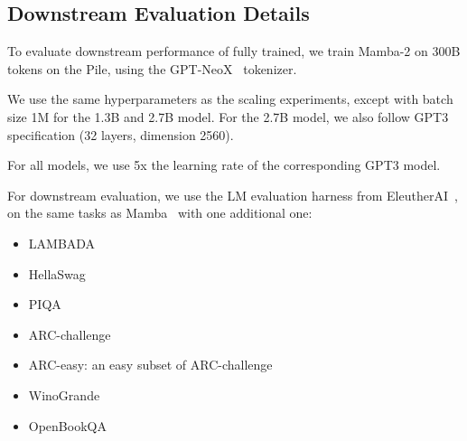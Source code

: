 \subsection{Downstream Evaluation Details}

To evaluate downstream performance of fully trained, we train Mamba-2 on 300B tokens on the Pile, using the GPT-NeoX~\citep{black2022gpt} tokenizer.

We use the same hyperparameters as the scaling experiments, except with batch
size 1M for the 1.3B and 2.7B model.
For the 2.7B model, we also follow GPT3 specification (32 layers, dimension 2560).

For all models, we use 5x the learning rate of the corresponding GPT3 model.


For downstream evaluation, we use the LM evaluation harness from EleutherAI~\citep{eval-harness}, on the same tasks as Mamba~\citep{gu2023mamba} with one additional one:
\begin{itemize}
  \item LAMBADA~\citep{paperno2016lambada}
  \item HellaSwag~\citep{zellers2019hellaswag}
  \item PIQA~\citep{bisk2020piqa}
  \item ARC-challenge~\citep{clark2018think}
  \item ARC-easy: an easy subset of ARC-challenge
  \item WinoGrande~\citep{sakaguchi2021winogrande}
  \item OpenBookQA~\citep{mihaylov2018can}
\end{itemize}


